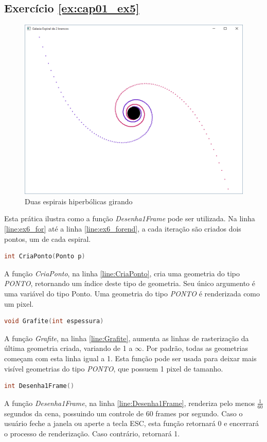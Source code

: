 \subsection*{Exercício \ref{ex:cap01_ex5}}
\begin{figure}[ht]
  \centerline{\includegraphics[width=.5\textwidth]{img/cap1_ex6.png}}
  \caption{Duas espirais hiperbólicas girando}
  \label{fig:cap01_ex5}
\end{figure}
Esta prática ilustra como a função \emph{Desenha1Frame} pode ser utilizada. Na linha \ref{line:ex6_for} até a linha \ref{line:ex6_forend}, a cada iteração são criados dois pontos, um de cada espiral.



\begin{lstlisting}[label={func:CriaPonto},language=C++]
int CriaPonto(Ponto p)
\end{lstlisting}
A função \emph{CriaPonto}, na linha \ref{line:CriaPonto}, cria uma geometria do tipo \emph{PONTO}, retornando um índice deste tipo de geometria. Seu único argumento é uma variável do tipo Ponto. Uma geometria do tipo \emph{PONTO} é renderizada como um pixel.

\begin{lstlisting}[label={func:Grafite},language=C++]
void Grafite(int espessura)
\end{lstlisting}
A função \emph{Grafite}, na linha \ref{line:Grafite}, aumenta as linhas de rasterização da última geometria criada, variando de 1 a $\infty$. Por padrão, todas as geometrias começam com esta linha igual a 1. Esta função pode ser usada para deixar mais visível geometrias do tipo \emph{PONTO}, que possuem 1 pixel de tamanho.

\begin{lstlisting}[label={func:Desenha1Frame},language=C++]
int Desenha1Frame()
\end{lstlisting}
A função \emph{Desenha1Frame}, na linha \ref{line:Desenha1Frame}, renderiza pelo menos $\frac{1}{60}$ segundos da cena, possuindo um controle de 60 frames por segundo. Caso o usuário feche a janela ou aperte a tecla ESC, esta função retornará 0 e encerrará o processo de renderização. Caso contrário, retornará 1.

